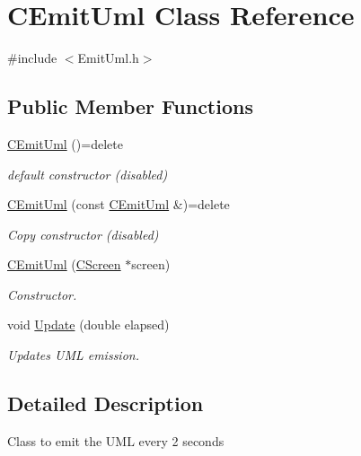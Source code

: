 \hypertarget{class_c_emit_uml}{}\section{C\+Emit\+Uml Class Reference}
\label{class_c_emit_uml}


{\ttfamily \#include $<$Emit\+Uml.\+h$>$}

\subsection*{Public Member Functions}
\begin{DoxyCompactItemize}
\item 
\mbox{\label{class_c_emit_uml_a2afea2c5bc1d64daf5cb89c6f5ec4fbe}} 
\mbox{\hyperlink{class_c_emit_uml_a2afea2c5bc1d64daf5cb89c6f5ec4fbe}{C\+Emit\+Uml}} ()=delete
\begin{DoxyCompactList}\small\item\em default constructor (disabled) \end{DoxyCompactList}\item 
\mbox{\label{class_c_emit_uml_ab0b3373faf46b798ed6c00c955000c69}} 
\mbox{\hyperlink{class_c_emit_uml_ab0b3373faf46b798ed6c00c955000c69}{C\+Emit\+Uml}} (const \mbox{\hyperlink{class_c_emit_uml}{C\+Emit\+Uml}} \&)=delete
\begin{DoxyCompactList}\small\item\em Copy constructor (disabled) \end{DoxyCompactList}\item 
\mbox{\hyperlink{class_c_emit_uml_ae09b06fae88495e3d0405b2b59ca215b}{C\+Emit\+Uml}} (\mbox{\hyperlink{class_c_screen}{C\+Screen}} $\ast$screen)
\begin{DoxyCompactList}\small\item\em Constructor. \end{DoxyCompactList}\item 
void \mbox{\hyperlink{class_c_emit_uml_a62f420af81daac9a4c2a54d5692c84a7}{Update}} (double elapsed)
\begin{DoxyCompactList}\small\item\em Updates U\+ML emission. \end{DoxyCompactList}\end{DoxyCompactItemize}


\subsection{Detailed Description}
Class to emit the U\+ML every 2 seconds 

